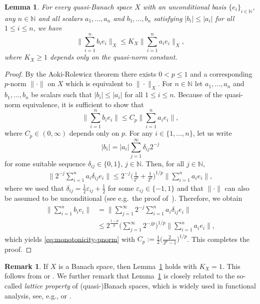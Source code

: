 \documentclass[a4paper,12pt]{article}
\newtheorem{lem}[thm]{Lemma}
\theoremstyle{definition}
\newtheorem{remark}{Remark}
\newcommand{\N}{\mathbb{N}}
\newcommand{\IN}{\mathbb{N}}
\begin{document}
\begin{lem}\label{lem:lattice}
For every quasi-Banach space $X$ with an unconditional basis $\{e_i\}_{i\in\N}$, any $n\in\IN$ and all scalars $a_1,\dots,a_n$ and $b_1,\dots,b_n$ satisfying $|b_i|\le |a_i|$ for all $1\le i\le n$, we have
\[
\Big\| \sum_{i=1}^{n}b_i e_i\Big\|_X
\le K_X\Big\| \sum_{i=1}^{n}a_i e_i\Big\|_X,
\]
where $K_X\ge 1$ depends only on the quasi-norm constant.
\end{lem}
\begin{proof}
By the Aoki-Rolewicz theorem there exists $0<p\le 1$ and a corresponding $p$-norm $\|\cdot\|$ on $X$ which is equivalent to $\|\cdot\|_X$. For $n\in\IN$ let $a_1,\dots,a_n$ and $b_1,\dots,b_n$ be scalars such that $|b_i|\le |a_i|$ for all $1\le i\le n$. Because of the quasi-norm equivalence, it is sufficient to show that
\begin{equation} \label{eq:monotonicity-pnorm}
\Big\|\sum_{i=1}^{n}b_ie_i\Big\|
\le C_p\Big\|\sum_{i=1}^{n}a_ie_i\Big\|,
\end{equation}
where $C_p\in(0,\infty)$ depends only on $p$.  For any $i\in\{1,\dots,n\}$, let us write 
  \[
    |b_i|=|a_i|\sum_{j=1}^{\infty}\delta_{ij} 2^{-j}
  \]   
for some suitable sequence $\delta_{ij}\in\{0,1\}$, $j\in\mathbb N$. Then, for all $j\in\mathbb N$, 
\begin{align*}
	\Big\|2^{-j}\sum_{i=1}^{n}a_i\delta_{ij}e_i\Big\|
	\le 2^{-j}\Big(\frac{1}{2^p}+\frac{1}{2^p}\Big)^{1/p}\Big\|\sum_{i=1}^{n}a_ie_i\Big\|,%
\end{align*}
where we used that $\delta_{ij}=\frac{1}{2}\varepsilon_{ij}+\frac{1}{2}$ for some $\varepsilon_{ij}\in \{-1,1\}$ and that $\|\cdot\|$ can also be assumed to be unconditional (see e.g.~the proof of~\cite[Proposition~1.c.5]{K1986}). Therefore, we obtain
\begin{align*}
\Big\|\sum_{i=1}^{n}b_ie_i\Big\|
&= \Big\|\sum_{j=1}^{\infty}2^{-j}\sum_{i=1}^{n}a_i\delta_{ij}e_i\Big\|\\
&\le 2^{\frac{1-p}{p}}\Big(\sum_{j=1}^{\infty}2^{-jp}\Big)^{1/p}\Big\|\sum_{i=1}^{n}a_ie_i\Big\|,
\end{align*}
which yields \eqref{eq:monotonicity-pnorm} with $C_p:= \frac{1}{2}\Big(\frac{2}{2^p-1}\Big)^{1/p}$. This completes the proof.
\end{proof}

\begin{remark}
If $X$ is a Banach space, then Lemma~\ref{lem:lattice} holds with $K_X=1$. This follows from \cite[Theorem 2]{BSW61} or \cite[Proposition 3.1.3]{AK06}. We further remark that Lemma~\ref{lem:lattice} is closely related to the so-called \emph{lattice property} of (quasi-)Banach spaces, which is widely used in functional analysis, see, e.g., \cite[Section 13.1]{Cal64} or \cite[(P2) in Definition 1.1.1]{BS88}. 
\end{remark}
\end{document}
